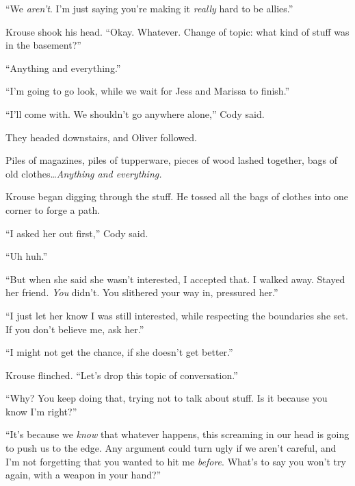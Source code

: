 ``We \emph{aren't}.  I'm just saying you're making it \emph{really} hard to be allies.''



Krouse shook his head.  ``Okay.  Whatever.  Change of topic: what kind of stuff was in the basement?''



``Anything and everything.''



``I'm going to go look, while we wait for Jess and Marissa to finish.''



``I'll come with.  We shouldn't go anywhere alone,'' Cody said.



They headed downstairs, and Oliver followed.



Piles of magazines, piles of tupperware, pieces of wood lashed together, bags of old clothes\ldots \emph{Anything and everything.}



Krouse began digging through the stuff.  He tossed all the bags of clothes into one corner to forge a path.



``I asked her out first,'' Cody said.



``Uh huh.''



``But when she said she wasn't interested, I accepted that.  I walked away.  Stayed her friend.  \emph{You} didn't.  You slithered your way in, pressured her.''



``I just let her know I was still interested, while respecting the boundaries she set.  If you don't believe me, ask her.''



``I might not get the chance, if she doesn't get better.''



Krouse flinched.  ``Let's drop this topic of conversation.''



``Why?  You keep doing that, trying not to talk about stuff.  Is it because you know I'm right?''



``It's because we \emph{know} that whatever happens, this screaming in our head is going to push us to the edge.  Any argument could turn ugly if we aren't careful, and I'm not forgetting that you wanted to hit me \emph{before}.  What's to say you won't try again, with a weapon in your hand?''



